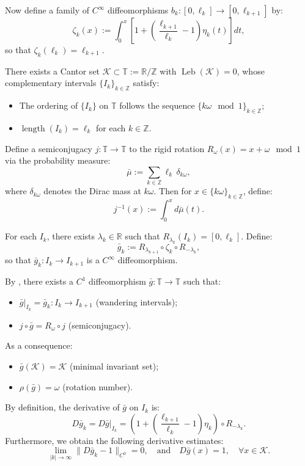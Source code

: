 \documentclass{amsart}
\theoremstyle{definition}
\begin{document}
Now define a family of $C^\infty$ diffeomorphisms $b_k : [0, \ell_k] \to [0, \ell_{k+1}]$ by:
\[
\zeta_k(x) := \int_0^x \left[1 + \left(\frac{\ell_{k+1}}{\ell_k} - 1\right)\eta_k(t)\right] dt,
\]
so that $\zeta_k(\ell_k) = \ell_{k+1}$.

There exists a Cantor set $\mathcal{K} \subset \mathbb{T} := \mathbb{R}/\mathbb{Z}$ with $\operatorname{Leb}(\mathcal{K}) = 0$, whose complementary intervals $\{I_k\}_{k\in\mathbb{Z}}$ satisfy:
\begin{itemize}
    \item The ordering of $\{I_k\}$ on $\mathbb{T}$ follows the sequence $\{k\omega \mod 1\}_{k\in\mathbb{Z}}$;
    \item $\operatorname{length}(I_k) = \ell_k$ for each $k \in \mathbb{Z}$.
\end{itemize}

Define a semiconjugacy $j : \mathbb{T} \to \mathbb{T}$ to the rigid rotation $R_\omega(x) = x + \omega \mod 1$ via the probability measure:
\[
\bar{\mu} := \sum_{k\in\mathbb{Z}} \ell_k\, \delta_{k\omega},
\]
where $\delta_{k\omega}$ denotes the Dirac mass at $k\omega$. Then for $x \in \{k\omega\}_{k\in\mathbb{Z}}$, define:
\[
j^{-1}(x) := \int_0^x d\bar{\mu}(t).
\]

For each $I_k$, there exists $\lambda_k \in \mathbb{R}$ such that $R_{\lambda_k}(I_k) = [0, \ell_k]$. Define:
\[
\bar{g}_k := R_{\lambda_{k+1}} \circ \zeta_k \circ R_{-\lambda_k},
\]
so that $\bar{g}_k : I_k \to I_{k+1}$ is a $C^\infty$ diffeomorphism.

By \cite[Chapter X, (3.12)¨C(3.13)]{H11}, there exists a $C^1$ diffeomorphism $\bar{g} : \mathbb{T} \to \mathbb{T}$ such that:
\begin{itemize}
    \item $\bar{g}|_{I_k} = \bar{g}_k : I_k \to I_{k+1}$ (wandering intervals);
    \item $j \circ \bar{g} = R_\omega \circ j$ (semiconjugacy).
\end{itemize}
As a consequence:
\begin{itemize}
    \item $\bar{g}(\mathcal{K}) = \mathcal{K}$ (minimal invariant set);
    \item $\rho(\bar{g}) = \omega$ (rotation number).
\end{itemize}

By definition, the derivative of $\bar{g}$ on $I_k$ is:
\[
D\bar{g}_k = D\bar{g}|_{I_k} = \left( 1 + \left( \frac{\ell_{k+1}}{\ell_k} - 1 \right) \eta_k \right) \circ R_{-\lambda_k}.
\]
Furthermore, we obtain the following derivative estimates:
\begin{equation}\label{gkgkp}
\lim_{|k|\to\infty} \|D\bar{g}_k - 1\|_{C^0} = 0, \quad \text{and} \quad D\bar{g}(x) = 1, \quad \forall x \in \mathcal{K}.
\end{equation}
\end{document}
